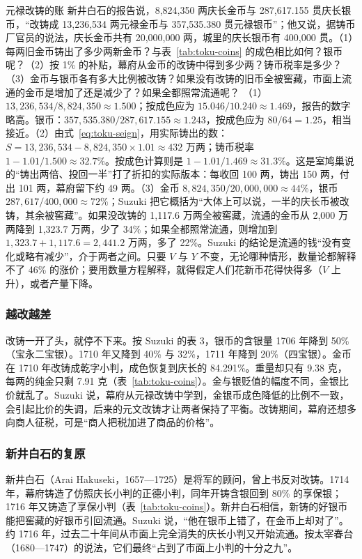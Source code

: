 \begin{example}{元禄改铸的账}\label{ex:toku-seign}
新井白石的报告说，8,824,350 两庆长金币与 287,617.155 贯庆长银币，“改铸成 13,236,534 两元禄金币与 357,535.380 贯元禄银币”；他又说，据铸币厂官员的说法，庆长金币共有 20,000,000 两，城里的庆长银币有 400,000 贯\cite{suzuki2021}。（1）每两旧金币铸出了多少两新金币？与表~\ref{tab:toku-coins} 的成色相比如何？银币呢？（2）按 1\% 的补贴，幕府从金币的改铸中得到多少两？铸币税率是多少？（3）金币与银币各有多大比例被改铸？如果没有改铸的旧币全被窖藏，市面上流通的金币是增加了还是减少了？如果全都照常流通呢？
\solution （1）$13{,}236{,}534/8{,}824{,}350\approx1.500$；按成色应为 $15.046/10.240\approx1.469$，报告的数字略高。银币：$357{,}535.380/287{,}617.155\approx1.243$，按成色应为 $80/64=1.25$，相当接近。（2）由式~\eqref{eq:toku-seign}，用实际铸出的数：$S=13{,}236{,}534-8{,}824{,}350\times1.01\approx432$ 万两；铸币税率 $1-1.01/1.500\approx32.7\%$。按成色计算则是 $1-1.01/1.469\approx31.3\%$。这是室鸠巢说的“铸出两倍、投回一半”打了折扣的实际版本：每收回 100 两，铸出 150 两，付出 101 两，幕府留下约 49 两。（3）金币 $8{,}824{,}350/20{,}000{,}000\approx44\%$，银币 $287{,}617/400{,}000\approx72\%$；Suzuki 把它概括为“大体上可以说，一半的庆长币被改铸，其余被窖藏”\cite{suzuki2021}。如果没改铸的 1,117.6 万两全被窖藏，流通的金币从 2,000 万两降到 1,323.7 万两，少了 34\%；如果全都照常流通，则增加到 $1{,}323.7+1{,}117.6=2{,}441.2$ 万两，多了 22\%。Suzuki 的结论是流通的钱“没有变化或略有减少”\cite{suzuki2021}，介于两者之间。只要 $V$ 与 $Y$ 不变，无论哪种情形，数量论都解释不了 46\% 的涨价；要用数量方程解释，就得假定人们花新币花得快得多（$V$ 上升），或者产量下降。
\end{example}

\subsubsection{越改越差}
改铸一开了头，就停不下来。按 Suzuki 的表 3，银币的含银量 1706 年降到 50\%（宝永二宝银）。1710 年又降到 40\% 与 32\%，1711 年降到 20\%（四宝银）。金币在 1710 年改铸成乾字小判，成色恢复到庆长的 84.291\%。重量却只有 9.38 克，每两的纯金只剩 7.91 克（表~\ref{tab:toku-coins}）\cite{suzuki2021}。金与银贬值的幅度不同，金银比价就乱了。Suzuki 说，幕府从元禄改铸中学到，金银币成色降低的比例不一致，会引起比价的失调，后来的元文改铸才让两者保持了平衡\cite{suzuki2021}。改铸期间，幕府还想多向商人征税，可是“商人把税加进了商品的价格”\cite{suzuki2021}。

\subsubsection{新井白石的复原}
新井白石（Arai Hakuseki，1657—1725）是将军的顾问，曾上书反对改铸\cite{suzuki2021}。1714 年，幕府铸造了仿照庆长小判的正德小判，同年开铸含银回到 80\% 的享保银；1716 年又铸造了享保小判（表~\ref{tab:toku-coins}）\cite{suzuki2021}。新井白石相信，新铸的好银币能把窖藏的好银币引回流通。Suzuki 说，“他在银币上错了，在金币上却对了”。约 1716 年，过去二十年间从市面上完全消失的庆长小判又开始流通。按太宰春台（1680—1747）的说法，它们最终“占到了市面上小判的十分之九”\cite{suzuki2021}。

